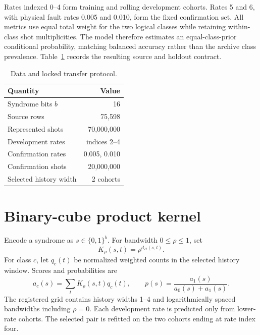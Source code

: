 \documentclass[10pt,letterpaper,twoside]{article}
\begin{document}
Rates indexed 0--4 form training and rolling development cohorts. Rates 5 and
6, with physical fault rates 0.005 and 0.010, form the fixed confirmation set.
All metrics use equal total weight for the two logical classes while retaining
within-class shot multiplicities. The model therefore estimates an
equal-class-prior conditional probability, matching balanced accuracy rather
than the archive class prevalence. Table~\ref{tab:data} records the resulting
source and holdout contract.

\begin{table}[t]
\caption{Data and locked transfer protocol.}
\label{tab:data}
\begin{ruledtabular}\begin{tabular}{lr}
Quantity & Value\\ \hline
Syndrome bits $b$ & 16\\
Source rows & 75,598\\
Represented shots & 70,000,000\\
Development rates & indices 2--4\\
Confirmation rates & 0.005, 0.010\\
Confirmation shots & 20,000,000\\
Selected history width & 2 cohorts
\end{tabular}\end{ruledtabular}
\end{table}

\section{Binary-cube product kernel}

Encode a syndrome as $s\in\{0,1\}^b$. For bandwidth $0\le\rho\le1$, set
\begin{equation}
 K_\rho(s,t)=\rho^{d_H(s,t)}.
\end{equation}
For class $c$, let $q_c(t)$ be normalized weighted counts in the selected
history window. Scores and probabilities are
\begin{equation}
 a_c(s)=\sum_tK_\rho(s,t)q_c(t),\qquad
 p(s)=\frac{a_1(s)}{a_0(s)+a_1(s)}. \label{eq:probability}
\end{equation}
The registered grid contains history widths 1--4 and logarithmically spaced
bandwidths including $\rho=0$. Each development rate is predicted only from
lower-rate cohorts. The selected pair is refitted on the two cohorts ending at
rate index four.
\end{document}
